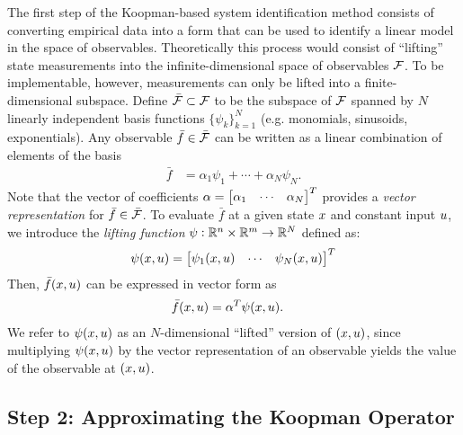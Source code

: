 The first step of the Koopman-based system identification method consists of converting empirical data into a form that can be used to identify a linear model in the space of observables.
Theoretically this process would consist of ``lifting'' state measurements into the infinite-dimensional space of observables $\mathcal{F}$.
To be implementable, however, measurements can only be lifted into a finite-dimensional subspace.
Define $\bar{\mathcal{F}} \subset \mathcal{F}$ to be the subspace of $\mathcal{F}$ spanned by $N$ linearly independent basis functions $\{ \psi_k \}_{k=1}^N$ 
(e.g. monomials, sinusoids, exponentials).
%
Any observable ${\bar{f} \in \bar{\mathcal{F}}}$ can be written as a linear combination of elements of the basis
\begin{align}
    \bar{f} &= \alpha_1 \psi_{1} + \cdots + \alpha_N \psi_N.
\end{align}
Note that the vector of coefficients ${\alpha = \begin{bmatrix} \alpha_1 & \cdots & \alpha_N \end{bmatrix}^T}$ provides a \emph{vector representation} for $\bar{f} \in \bar{\mathcal{F}}$.
To evaluate $\bar{f}$ at a given state $x$ and constant input $u$, we introduce the \emph{lifting function} ${\psi}:\mathbb{R}^n \times \mathbb{R}^m \to \mathbb{R}^N$ defined as:
\begin{align}
    {\psi}(x, u) = \begin{bmatrix}  \psi_1(x, u) & \cdots & \psi_N(x, u) \end{bmatrix}^T
    \label{eq:lift}
\end{align}
Then, $\bar{f}(x, u)$ can be expressed in vector form as
\begin{align}
    \bar{f}(x, u) &= {\alpha}^T {\psi}(x, u).
    \label{eq:fxu}
\end{align}
We refer to ${\psi}(x, u)$ as an $N$-dimensional ``lifted'' version of ${(x, u)}$, since multiplying ${\psi}(x, u)$ by the vector representation of an observable yields the value of the observable at $(x, u)$.



\subsection{Step 2: Approximating the Koopman Operator} \label{sec:step2}

